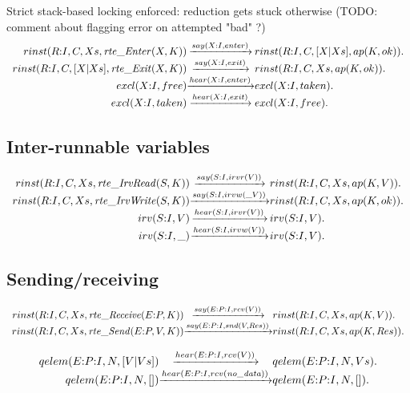 Strict stack-based locking enforced: reduction gets stuck otherwise
(TODO: comment about flagging error on attempted "bad" ?)
\[
\begin{array}{r@{}c@{}l}
  \Preduce{rinst(R{:}I, C, Xs,     \rte{Enter}(X,K))}{say(X{:}I,enter)} {rinst(R{:}I, C, [X|Xs], ap(K,ok))}  .
\\\Preduce{rinst(R{:}I, C, [X|Xs], \rte{Exit}(X,K))} {say(X{:}I,exit)}  {rinst(R{:}I, C, Xs,     ap(K,ok))}      .
\\\Preduce{excl(X{:}I, free)}                     {hear(X{:}I,enter)}{excl(X{:}I, taken)}                 .
\\\Preduce{excl(X{:}I, taken)}                    {hear(X{:}I,exit)} {excl(X{:}I, free)}                  .
\end{array}
\]
\subsection{Inter-runnable variables}

\[
\begin{array}{r@{}c@{}l}
  \Preduce{rinst(R{:}I, C, Xs, \rte{IrvRead}(S,K))} {say(S{:}I,irvr(V))}  {rinst(R{:}I, C, Xs, ap(K,V))}  .
\\\Preduce{rinst(R{:}I, C, Xs, \rte{IrvWrite}(S,K))}{say(S{:}I,irvw(\_V))}{rinst(R{:}I, C, Xs, ap(K,ok))} .
\\\Preduce{irv(S{:}I, V)}                           {hear(S{:}I,irvr(V))} {irv(S{:}I, V)}                 .
\\\Preduce{irv(S{:}I,\_)}                           {hear(S{:}I,irvw(V))} {irv(S{:}I, V)}                 .
\end{array}
\]


\subsection{Sending/receiving}

\[
\begin{array}{r@{}c@{}l}
  \Preduce{rinst(R{:}I, C, Xs, \rte{Receive}(E{:}P,K))}{say(E{:}P{:}I,rcv(V))}    {rinst(R{:}I, C, Xs, ap(K,V))} .
\\\Preduce{rinst(R{:}I, C, Xs, \rte{Send}(E{:}P,V,K))} {say(E{:}P{:}I,snd(V,Res))}{rinst(R{:}I, C, Xs, ap(K,Res))}.
\end{array}
\]

\newcommand{\nodata}{\ensuremath{\mathit{no\_data}}}
\[
\begin{array}{r@{}c@{}l}
  \Preduce{qelem(E{:}P{:}I, N, [V|Vs])}{hear(E{:}P{:}I,rcv(V))}      {qelem(E{:}P{:}I, N, Vs)}    .
\\\Preduce{qelem(E{:}P{:}I, N, [])}    {hear(E{:}P{:}I,rcv(\nodata))}{qelem(E{:}P{:}I, N, [])}    .
\end{array}
\]


